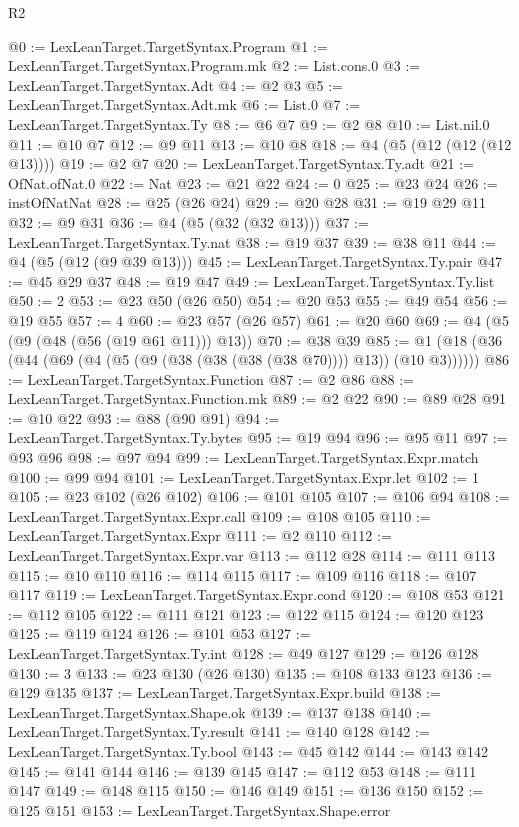 \begin{lexlean}{R2}
\begin{coremodule}
{{{{{{{{{{{{{{{{{{{{{{{{{{{{{{{{{{{{{{{{{{{{{{{{{{{{{{{{{{{{{{{{{{{{{{{{{{{{{{{{{{{{{{{{{{{{{{{{{{{{{{{{{{{{{{{{{{{{{{{{{{{{{{{{{{{{{{{{{{{{@0 := LexLeanTarget.TargetSyntax.Program
@1 := LexLeanTarget.TargetSyntax.Program.mk
@2 := List.cons.{0}
@3 := LexLeanTarget.TargetSyntax.Adt
@4 := @2 @3
@5 := LexLeanTarget.TargetSyntax.Adt.mk
@6 := List.{0}
@7 := LexLeanTarget.TargetSyntax.Ty
@8 := @6 @7
@9 := @2 @8
@10 := List.nil.{0}
@11 := @10 @7
@12 := @9 @11
@13 := @10 @8
@18 := @4 (@5 (@12 (@12 (@12 @13))))
@19 := @2 @7
@20 := LexLeanTarget.TargetSyntax.Ty.adt
@21 := OfNat.ofNat.{0}
@22 := Nat
@23 := @21 @22
@24 := 0
@25 := @23 @24
@26 := instOfNatNat
@28 := @25 (@26 @24)
@29 := @20 @28
@31 := @19 @29 @11
@32 := @9 @31
@36 := @4 (@5 (@32 (@32 @13)))
@37 := LexLeanTarget.TargetSyntax.Ty.nat
@38 := @19 @37
@39 := @38 @11
@44 := @4 (@5 (@12 (@9 @39 @13)))
@45 := LexLeanTarget.TargetSyntax.Ty.pair
@47 := @45 @29 @37
@48 := @19 @47
@49 := LexLeanTarget.TargetSyntax.Ty.list
@50 := 2
@53 := @23 @50 (@26 @50)
@54 := @20 @53
@55 := @49 @54
@56 := @19 @55
@57 := 4
@60 := @23 @57 (@26 @57)
@61 := @20 @60
@69 := @4 (@5 (@9 (@48 (@56 (@19 @61 @11))) @13))
@70 := @38 @39
@85 := @1 (@18 (@36 (@44 (@69 (@4 (@5 (@9 (@38 (@38 (@38 (@38 @70)))) @13)) (@10 @3))))))
@86 := LexLeanTarget.TargetSyntax.Function
@87 := @2 @86
@88 := LexLeanTarget.TargetSyntax.Function.mk
@89 := @2 @22
@90 := @89 @28
@91 := @10 @22
@93 := @88 (@90 @91)
@94 := LexLeanTarget.TargetSyntax.Ty.bytes
@95 := @19 @94
@96 := @95 @11
@97 := @93 @96
@98 := @97 @94
@99 := LexLeanTarget.TargetSyntax.Expr.match
@100 := @99 @94
@101 := LexLeanTarget.TargetSyntax.Expr.let
@102 := 1
@105 := @23 @102 (@26 @102)
@106 := @101 @105
@107 := @106 @94
@108 := LexLeanTarget.TargetSyntax.Expr.call
@109 := @108 @105
@110 := LexLeanTarget.TargetSyntax.Expr
@111 := @2 @110
@112 := LexLeanTarget.TargetSyntax.Expr.var
@113 := @112 @28
@114 := @111 @113
@115 := @10 @110
@116 := @114 @115
@117 := @109 @116
@118 := @107 @117
@119 := LexLeanTarget.TargetSyntax.Expr.cond
@120 := @108 @53
@121 := @112 @105
@122 := @111 @121
@123 := @122 @115
@124 := @120 @123
@125 := @119 @124
@126 := @101 @53
@127 := LexLeanTarget.TargetSyntax.Ty.int
@128 := @49 @127
@129 := @126 @128
@130 := 3
@133 := @23 @130 (@26 @130)
@135 := @108 @133 @123
@136 := @129 @135
@137 := LexLeanTarget.TargetSyntax.Expr.build
@138 := LexLeanTarget.TargetSyntax.Shape.ok
@139 := @137 @138
@140 := LexLeanTarget.TargetSyntax.Ty.result
@141 := @140 @128
@142 := LexLeanTarget.TargetSyntax.Ty.bool
@143 := @45 @142
@144 := @143 @142
@145 := @141 @144
@146 := @139 @145
@147 := @112 @53
@148 := @111 @147
@149 := @148 @115
@150 := @146 @149
@151 := @136 @150
@152 := @125 @151
@153 := LexLeanTarget.TargetSyntax.Shape.error
}}}}}}}}}}}}}}}}}}}}}}}}}}}}}}}}}}}}}}}}}}}}}}}}}}}}}}}}}}}}}}}}}}}}}}}}}}}}}}}}}}}}}}}}}}}}}}}}}}}}}}}}}}}}}}}}}}}}}}}}}}}}}}}}}}}}}}}}}}}}
\end{coremodule}
\end{lexlean}
